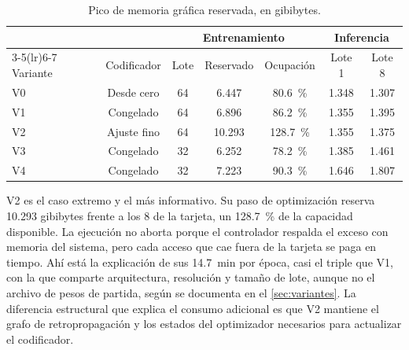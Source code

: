 \begin{table}[htbp]
  \centering
  \caption{Pico de memoria gr\'afica reservada, en gibibytes.}
  \label{tab:memoria-gpu}
  \small
  \begin{tabular}{lcccccc}
    \toprule
    & & \multicolumn{3}{c}{Entrenamiento} & \multicolumn{2}{c}{Inferencia} \\
    \cmidrule(lr){3-5}\cmidrule(lr){6-7}
    Variante & Codificador & Lote & Reservado & Ocupaci\'on
             & Lote \num{1} & Lote \num{8} \\
    \midrule
    V0 & Desde cero  & \num{64} & \num{6.447} & \SI{80.6}{\percent}  & \num{1.348} & \num{1.307} \\
    V1 & Congelado   & \num{64} & \num{6.896} & \SI{86.2}{\percent}  & \num{1.355} & \num{1.395} \\
    V2 & Ajuste fino & \num{64} & \num{10.293} & \SI{128.7}{\percent} & \num{1.355} & \num{1.375} \\
    V3 & Congelado   & \num{32} & \num{6.252} & \SI{78.2}{\percent}  & \num{1.385} & \num{1.461} \\
    V4 & Congelado   & \num{32} & \num{7.223} & \SI{90.3}{\percent}  & \num{1.646} & \num{1.807} \\
    \bottomrule
  \end{tabular}
\end{table}

V2 es el caso extremo y el m\'as informativo. Su paso de optimizaci\'on reserva
\num{10.293} gibibytes frente a los \num{8} de la tarjeta, un \SI{128.7}{\percent} de la
capacidad disponible. La ejecuci\'on no aborta porque el controlador respalda el exceso con
memoria del sistema, pero cada acceso que cae fuera de la tarjeta se paga en tiempo. Ah\'i
est\'a la explicaci\'on de sus \SI{14.7}{\minute} por \'epoca, casi el triple que V1, con la
que comparte arquitectura, resoluci\'on y tama\~no de lote, aunque no el archivo de pesos de
partida, seg\'un se documenta en el \cref{sec:variantes}. La diferencia estructural que
explica el consumo adicional es que V2 mantiene el grafo de retropropagaci\'on y los estados
del optimizador necesarios para actualizar el codificador.

